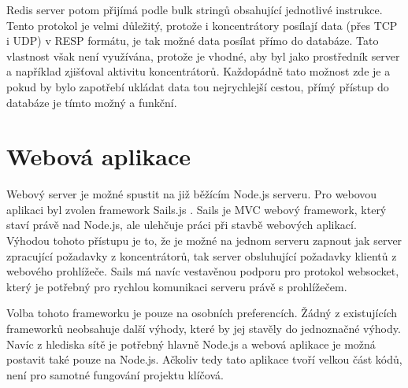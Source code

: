 Redis server potom přijímá podle bulk stringů obsahující jednotlivé instrukce. Tento protokol je velmi důležitý, protože i koncentrátory posílají data (přes TCP i UDP) v RESP formátu, je tak možné data posílat přímo do databáze. Tato vlastnost však není využívána, protože je vhodné, aby byl jako prostředník server a například zjišťoval aktivitu koncentrátorů. Každopádně tato možnost zde je a pokud by bylo zapotřebí ukládat data tou nejrychlejší cestou, přímý přístup do databáze je tímto možný a funkční.

\section{Webová aplikace}
Webový server je možné spustit na již běžícím Node.js serveru. Pro webovou aplikaci byl zvolen framework Sails.js \cite{sails}. Sails je MVC webový framework, který staví právě nad Node.js, ale ulehčuje práci při stavbě webových aplikací. Výhodou tohoto přístupu je to, že je možné na jednom serveru zapnout jak server zpracující požadavky z koncentrátorů, tak server obsluhující požadavky klientů z webového prohlížeče. Sails má navíc vestavěnou podporu pro protokol websocket, který je potřebný pro rychlou komunikaci serveru právě s prohlížečem.

Volba tohoto frameworku je pouze na osobních preferencích. Žádný z existujících frameworků neobsahuje další výhody, které by jej stavěly do jednoznačné výhody. Navíc z hlediska sítě je potřebný hlavně Node.js a webová aplikace je možná postavit také pouze na Node.js. Ačkoliv tedy tato aplikace tvoří velkou část kódů, není pro samotné fungování projektu klíčová.